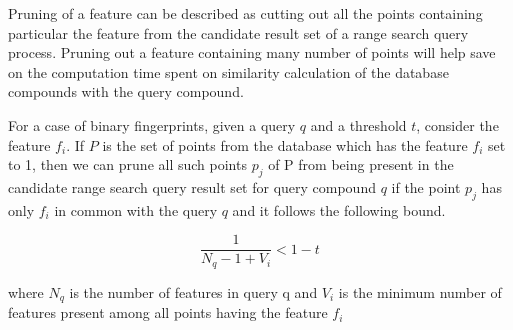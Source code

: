 Pruning of a feature can be described as cutting out all the points containing  particular the feature from the candidate result set of a range search query process. Pruning out a feature containing many number of points will help save on the computation time spent on similarity calculation of the database compounds with the query compound.


\begin{thm}
\label{thm1bound}
For a case of binary fingerprints, given a query $q$ and a threshold $t$, consider the feature $f_i$. If $P$ is the set of points from the database which has the feature $f_i$ set to 1, then we can prune all such points $p_j$ of P from being present in the candidate range search query result set for query compound $q$ if the point $p_j$ has only $f_i$ in common with the query $q$ and it follows the following bound. 

\begin{equation}
\label{eq:boun}
\frac{1}{N_q - 1 + V_{i}}  < 1-t
\end{equation}

where $N_q$ is the number of features in query q and $V_{i}$ is the minimum number of features present among all points having the feature $f_i$

\end{thm}



